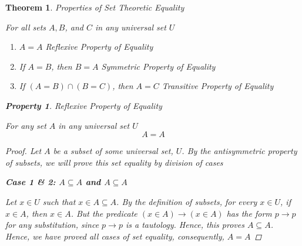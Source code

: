 \documentclass{book}
\newtheorem{theorem}{Theorem}[section]
\newtheorem{property}{Property}[theorem]
\theoremstyle{definition}
\theoremstyle{remark}
\begin{document}
\newpage
\begin{theorem}
Properties of Set Theoretic Equality \\

    \begin{tcolorbox}
        For all sets $A, B$, and $C$ in any universal set $U$ \\
    
        \begin{enumerate}
            \item $A = A$ \textit{Reflexive Property of Equality} %
            \item If $A = B$, then $B = A$ \textit{Symmetric Property of Equality} 
            \item If $(A = B) \cap (B = C)$, then $A = C$ \textit{Transitive Property of Equality} 
        \end{enumerate}
    \end{tcolorbox}



    \begin{property}
    Reflexive Property of Equality  \\
        \begin{tcolorbox}
            For any set $A$ in any universal set $U$
                \begin{equation*}
                    A = A
                \end{equation*}
        \end{tcolorbox}
        
        \begin{proof}
             Let $A$ be a subset of some universal set, $U$. By the antisymmetric property of subsets, we will prove this set equality by division of cases 
             
             
             \begin{flushleft} \textbf{Case 1 \& 2: $A \subseteq A$ and $A \subseteq A$ } \end{flushleft}
                Let $x \in U$ such that $x \in A \subseteq A$. By the definition of subsets, for every $x \in U$, if $x \in A$, then $x \in A$. But the predicate $(x \in A) \to (x \in A)$ has the form $p \to p$ for any substitution, since $p \to p$ is a tautology. Hence, this proves $A \subseteq A$. \\
                
            Hence, we have proved all cases of set equality, consequently, $A = A$
        \end{proof}
    \end{property}
\end{theorem}
\end{document}
